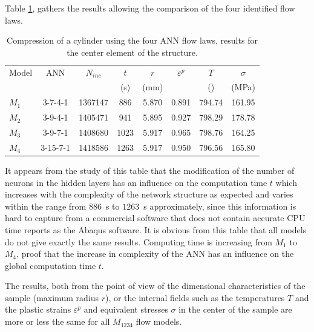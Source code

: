\documentclass[algorithms,article,submit,pdftex,moreauthors]{Definitions/mdpi}
\begin{document}
Table \ref{tab:SimuResults}, gathers the results allowing the comparison of the four identified flow laws.
\begin{table}[h!]
\centering
\caption{Compression of a cylinder using the four ANN flow laws, results for the center element of the structure.}
\begin{tabular}{lccccccc}
	\hline
	Model &   ANN    & $N_{inc}$ & $t$  &  $r$  & $\varepsilon^p$ &    $T$     & $\sigma$ \\
	      &          &           & (s)  & (mm)  &                 & (\celsius) &  (MPa)   \\ \hline
	$M_1$ & 3-7-4-1  &  1367147  & 886  & 5.870 &      0.891      &   794.74   &  161.95  \\
	$M_2$ & 3-9-4-1  &  1405471  & 941  & 5.895 &      0.927      &   798.29   &  178.78  \\
	$M_3$ & 3-9-7-1  &  1408680  & 1023 & 5.917 &      0.965      &   798.76   &  164.25  \\
	$M_4$ & 3-15-7-1 &  1418586  & 1263 & 5.917 &      0.950      &   796.56   &  165.80  \\ \hline
\end{tabular}
\label{tab:SimuResults}
\end{table}
It appears from the study of this table that the modification of the number of neurons in the hidden layers has an influence on the computation time $t$ which increases with the complexity of the network structure as expected and varies within the range from $886$~s to $1263$~s approximately, since this information is hard to capture from a commercial software that does not contain accurate CPU time reports as the Abaqus software.
It is obvious from this table that all models do not give exactly the same results.
Computing time is increasing from $M_{1}$ to $M_4$, proof that the increase in complexity of the ANN has an influence on the global computation time $t$.

The results, both from the point of view of the dimensional characteristics of the sample (maximum radius $r$), or the internal fields such as the temperatures $T$ and the plastic strains $\varepsilon^p$ and equivalent stresses $\sigma$ in the center of the sample are more or less the same for all $M_{1234}$ flow models.
\end{document}
